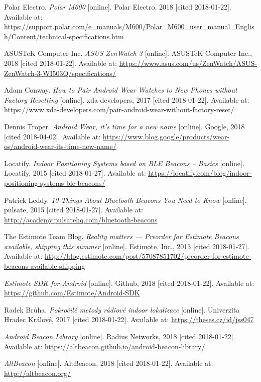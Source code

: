 \begin{thebibliography}{10}
Polar Electro. \textit{Polar M600} [online]. Polar Electro, 2018 [cited 2018-01-22]. Available at: \url{https://support.polar.com/e_manuals/M600/Polar_M600_user_manual_English/Content/technical-specifications.htm}

ASUSTeK Computer Inc. \textit{ASUS ZenWatch 3} [online]. ASUSTeK Computer Inc., 2018 [cited 2018-01-22]. Available at: \url{https://www.asus.com/us/ZenWatch/ASUS-ZenWatch-3-WI503Q/specifications/}

Adam Conway. \textit{How to Pair Android Wear Watches to New Phones without Factory Resetting} [online]. xda-developers, 2017 [cited 2018-01-22]. Available at: \url{https://www.xda-developers.com/pair-android-wear-without-factory-reset/}

Dennis Troper. \textit{Android Wear, it’s time for a new name} [online]. Google, 2018 [cited 2018-04-02]. Available at: \url{https://www.blog.google/products/wear-os/android-wear-its-time-new-name/}

Locatify. \textit{Indoor Positioning Systems based on BLE Beacons – Basics} [online]. Locatify, 2015 [cited 2018-01-27]. Available at: \url{https://locatify.com/blog/indoor-positioning-systems-ble-beacons/}

Patrick Leddy. \textit{10 Things About Bluetooth Beacons You Need to Know} [online]. pulsate, 2015 [cited 2018-01-27]. Available at: \url{http://academy.pulsatehq.com/bluetooth-beacons}

The Estimote Team Blog. \textit{Reality matters — Preorder for Estimote Beacons available, shipping this summer} [online]. Estimote, Inc., 2013 [cited 2018-01-27]. Available at: \url{http://blog.estimote.com/post/57087851702/preorder-for-estimote-beacons-available-shipping}

\textit{Estimote SDK for Android} [online]. Github, 2018 [cited 2018-01-22]. Available at: \url{https://github.com/Estimote/Android-SDK}

Radek Brůha. \textit{Pokročilé metody rádiové indoor lokalizace} [online]. Univerzita Hradec Králové, 2017 [cited 2018-01-22]. Available at: \url{https://theses.cz/id/jss047}

\textit{Android Beacon Library} [online]. Radius Networks, 2018 [cited 2018-01-22]. Available at: \url{https://altbeacon.github.io/android-beacon-library/}

\textit{AltBeacon} [online]. AltBeacon, 2018 [cited 2018-01-22]. Available at: \url{http://altbeacon.org/}


\end{thebibliography}
